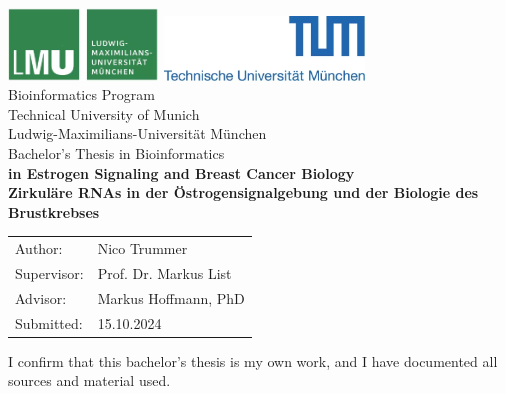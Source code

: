 \documentclass[pdftex,12pt,a4paper]{report}
\begin{document}
\begin{titlepage}

    \begin{center}
        \includegraphics[width=0.3\textwidth]{logos/lmu.png}
        \hfill
        \includegraphics[width=0.4\textwidth]{logos/tum.png}
        \\[3cm]

        {\Large Bioinformatics Program}\\[0.5cm]
        {\Large Technical University of Munich}\\[0.5cm]
        {\Large Ludwig-Maximilians-Universität München}\\[2cm]
        {\Large Bachelor's Thesis in Bioinformatics}\\[2cm]
        {\textbf{\LARGE {} in Estrogen Signaling and
            Breast Cancer
            Biology}}\\[2cm]
        {\textbf{\LARGE Zirkuläre RNAs in der Östrogensignalgebung und
            der
            Biologie des
            Brustkrebses}}\\[3cm]

    \end{center}

    \begin{center}\Large
        \begin{tabular}{ll}
            Author: & Nico Trummer \\ Supervisor: & Prof.
               Dr.
            Markus List            \\ Advisor: & Markus Hoffmann, PhD	    \\ Submitted: &
               15.10.2024\end{tabular} \end{center} 

\end{titlepage} 

\noindent I confirm that this bachelor's thesis is my own work, and I have
documented all sources and material used.
\end{document}
